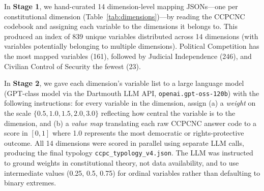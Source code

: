 \documentclass[9pt,twoside]{pnas-new}
\begin{document}
In \textbf{Stage 1}, we hand-curated 14 dimension-level mapping JSONs---one per constitutional dimension (Table~\ref{tab:dimensions})---by reading the CCPCNC codebook and assigning each variable to the dimensions it belongs to. This produced an index of 839 unique variables distributed across 14 dimensions (with variables potentially belonging to multiple dimensions). Political Competition has the most mapped variables (161), followed by Judicial Independence (246), and Civilian Control of Security the fewest (23).

In \textbf{Stage 2}, we gave each dimension's variable list to a large language model (GPT-class model via the Dartmouth LLM API, \texttt{openai.gpt-oss-120b}) with the following instructions: for every variable in the dimension, assign (a) a \emph{weight} on the scale $\{0.5, 1.0, 1.5, 2.0, 3.0\}$ reflecting how central the variable is to the dimension, and (b) a \emph{value map} translating each raw CCPCNC answer code to a score in $[0, 1]$ where 1.0 represents the most democratic or rights-protective outcome. All 14 dimensions were scored in parallel using separate LLM calls, producing the final typology \texttt{ccpc\_typology\_v4.json}. The LLM was instructed to ground weights in constitutional theory, not data availability, and to use intermediate values (0.25, 0.5, 0.75) for ordinal variables rather than defaulting to binary extremes.
\end{document}
